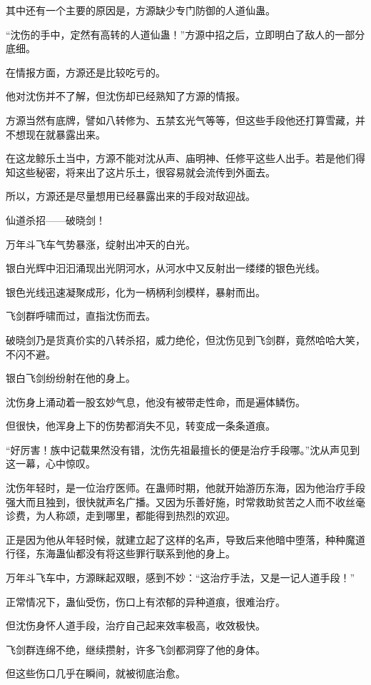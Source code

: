 \begin{this_body}
其中还有一个主要的原因是，方源缺少专门防御的人道仙蛊。

“沈伤的手中，定然有高转的人道仙蛊！”方源中招之后，立即明白了敌人的一部分底细。

在情报方面，方源还是比较吃亏的。

他对沈伤并不了解，但沈伤却已经熟知了方源的情报。

方源当然有底牌，譬如八转修为、五禁玄光气等等，但这些手段他还打算雪藏，并不想现在就暴露出来。

在这龙鲸乐土当中，方源不能对沈从声、庙明神、任修平这些人出手。若是他们得知这些秘密，将来出了这片乐土，很容易就会流传到外面去。

所以，方源还是尽量想用已经暴露出来的手段对敌迎战。

仙道杀招——破晓剑！

万年斗飞车气势暴涨，绽射出冲天的白光。

银白光辉中汩汩涌现出光阴河水，从河水中又反射出一缕缕的银色光线。

银色光线迅速凝聚成形，化为一柄柄利剑模样，暴射而出。

飞剑群呼啸而过，直指沈伤而去。

破晓剑乃是货真价实的八转杀招，威力绝伦，但沈伤见到飞剑群，竟然哈哈大笑，不闪不避。

银白飞剑纷纷射在他的身上。

沈伤身上涌动着一股玄妙气息，他没有被带走性命，而是遍体鳞伤。

但很快，他浑身上下的伤势都消失不见，转变成一条条道痕。

“好厉害！族中记载果然没有错，沈伤先祖最擅长的便是治疗手段哪。”沈从声见到这一幕，心中惊叹。

沈伤年轻时，是一位治疗医师。在蛊师时期，他就开始游历东海，因为他治疗手段强大而且独到，很快就声名广播。又因为乐善好施，时常救助贫苦之人而不收丝毫诊费，为人称颂，走到哪里，都能得到热烈的欢迎。

正是因为他从年轻时候，就建立起了这样的名声，导致后来他暗中堕落，种种魔道行径，东海蛊仙都没有将这些罪行联系到他的身上。

万年斗飞车中，方源眯起双眼，感到不妙：“这治疗手法，又是一记人道手段！”

正常情况下，蛊仙受伤，伤口上有浓郁的异种道痕，很难治疗。

但沈伤身怀人道手段，治疗自己起来效率极高，收效极快。

飞剑群连绵不绝，继续攒射，许多飞剑都洞穿了他的身体。

但这些伤口几乎在瞬间，就被彻底治愈。


\end{this_body}
